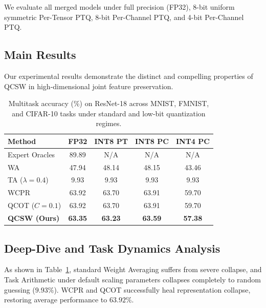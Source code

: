 \documentclass{article}
\theoremstyle{plain}
\theoremstyle{definition}
\theoremstyle{remark}
\begin{document}
We evaluate all merged models under full precision (FP32), 8-bit uniform symmetric Per-Tensor PTQ, 8-bit Per-Channel PTQ, and 4-bit Per-Channel PTQ.

\subsection{Main Results}
Our experimental results demonstrate the distinct and compelling properties of QCSW in high-dimensional joint feature preservation.

\begin{table}[h]
\caption{Multitask accuracy (\%) on ResNet-18 across MNIST, FMNIST, and CIFAR-10 tasks under standard and low-bit quantization regimes.}
\label{tab:results}
\vskip 0.15in
\begin{center}
\begin{small}
\begin{sc}
\setlength{\tabcolsep}{3pt}
\begin{tabular}{lcccc}
\toprule
Method & FP32 & INT8 PT & INT8 PC & INT4 PC \\
\midrule
Expert Oracles & 89.89 & N/A & N/A & N/A \\
\midrule
WA & 47.94 & 48.14 & 48.15 & 43.46 \\
TA ($\lambda=0.4$) & 9.93 & 9.93 & 9.93 & 9.93 \\
WCPR & 63.92 & 63.70 & 63.91 & 59.70 \\
QCOT ($C=0.1$) & 63.92 & 63.70 & 63.91 & 59.70 \\
\textbf{QCSW (Ours)} & \textbf{63.35} & \textbf{63.23} & \textbf{63.59} & \textbf{57.38} \\
\bottomrule
\end{tabular}
\end{sc}
\end{small}
\end{center}
\vskip -0.1in
\end{table}

\subsection{Deep-Dive and Task Dynamics Analysis}
As shown in Table~\ref{tab:results}, standard Weight Averaging suffers from severe collapse, and Task Arithmetic under default scaling parameters collapses completely to random guessing ($9.93\%$). WCPR and QCOT successfully heal representation collapse, restoring average performance to $63.92\%$.
\end{document}
